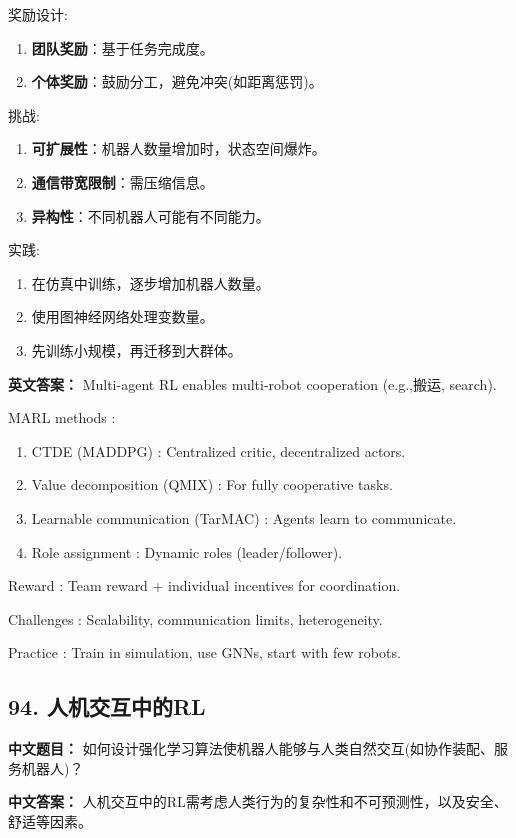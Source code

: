 \documentclass[10pt,a4paper]{ctexart}
\begin{document}
 奖励设计:
\begin{enumerate}
    \item \textbf{团队奖励}：基于任务完成度。
    \item \textbf{个体奖励}：鼓励分工，避免冲突(如距离惩罚)。
\end{enumerate}

 挑战:
\begin{enumerate}
    \item \textbf{可扩展性}：机器人数量增加时，状态空间爆炸。
    \item \textbf{通信带宽限制}：需压缩信息。
    \item \textbf{异构性}：不同机器人可能有不同能力。
\end{enumerate}

 实践:
\begin{enumerate}
    \item 在仿真中训练，逐步增加机器人数量。
    \item 使用图神经网络处理变数量。
    \item 先训练小规模，再迁移到大群体。
\end{enumerate}

\textbf{英文答案：}  
Multi-agent RL enables multi-robot cooperation (e.g.,搬运, search).

 MARL methods :
\begin{enumerate}
    \item CTDE (MADDPG) : Centralized critic, decentralized actors.
    \item Value decomposition (QMIX) : For fully cooperative tasks.
    \item Learnable communication (TarMAC) : Agents learn to communicate.
    \item Role assignment : Dynamic roles (leader/follower).
\end{enumerate}

 Reward : Team reward + individual incentives for coordination.

 Challenges : Scalability, communication limits, heterogeneity.

 Practice : Train in simulation, use GNNs, start with few robots.

\subsection*{94. 人机交互中的RL}
\textbf{中文题目：} 如何设计强化学习算法使机器人能够与人类自然交互(如协作装配、服务机器人)？

\textbf{中文答案：}  
人机交互中的RL需考虑人类行为的复杂性和不可预测性，以及安全、舒适等因素。
\end{document}
